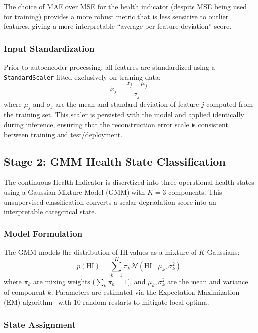 \documentclass[preprint,12pt]{elsarticle}
\begin{document}
The choice of MAE over MSE for the health indicator (despite MSE being used for training) provides a more robust metric that is less sensitive to outlier features, giving a more interpretable ``average per-feature deviation'' score.

\subsubsection{Input Standardization}

Prior to autoencoder processing, all features are standardized using a \texttt{StandardScaler} fitted exclusively on training data:
\begin{equation}
    \tilde{x}_j = \frac{x_j - \mu_j}{\sigma_j}
\end{equation}
where $\mu_j$ and $\sigma_j$ are the mean and standard deviation of feature $j$ computed from the training set. This scaler is persisted with the model and applied identically during inference, ensuring that the reconstruction error scale is consistent between training and test/deployment.

\subsection{Stage 2: GMM Health State Classification}
\label{sec:gmm}

The continuous Health Indicator is discretized into three operational health states using a Gaussian Mixture Model (GMM) with $K=3$ components. This unsupervised classification converts a scalar degradation score into an interpretable categorical state.

\subsubsection{Model Formulation}

The GMM models the distribution of HI values as a mixture of $K$ Gaussians:
\begin{equation}
    p(\mathrm{HI}) = \sum_{k=1}^{K} \pi_k \, \mathcal{N}(\mathrm{HI} \mid \mu_k, \sigma_k^2)
\end{equation}
where $\pi_k$ are mixing weights ($\sum_k \pi_k = 1$), and $\mu_k, \sigma_k^2$ are the mean and variance of component $k$. Parameters are estimated via the Expectation-Maximization (EM) algorithm~\cite{dempster1977} with 10 random restarts to mitigate local optima.

\subsubsection{State Assignment}
\end{document}
